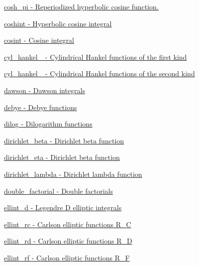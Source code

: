 \begin{DoxyItemize}
\item \hyperlink{group__gnu__math__spec__func_ga633224563637e80a4cda93863a693ad6}{cosh\+\_\+pi -\/ Reperiodized hyperbolic cosine function.}
\item \hyperlink{group__gnu__math__spec__func_ga901c23871fded7d4467a864fe06bbf07}{coshint -\/ Hyperbolic cosine integral}
\item \hyperlink{group__gnu__math__spec__func_ga06eed76a045a73ad72fcf4ad00b05f96}{cosint -\/ Cosine integral}
\item \hyperlink{group__gnu__math__spec__func_gafa5ad1cfd4cc30caaeb06bdab71e600b}{cyl\+\_\+hankel\+\_ -\/ Cylindrical Hankel functions of the first kind}
\item \hyperlink{group__gnu__math__spec__func_ga6c1d2d390e547ded9e0f4cc46395d90c}{cyl\+\_\+hankel\+\_ -\/ Cylindrical Hankel functions of the second kind}
\item \hyperlink{group__gnu__math__spec__func_ga0623ddcbfdce696781e19648fde6f33a}{dawson -\/ Dawson integrals}
\item \hyperlink{group__gnu__math__spec__func_ga4bd3029fcde3afdeee5f313b2ebc6b0d}{debye -\/ Debye functions}
\item \hyperlink{group__gnu__math__spec__func_ga7a95a3cb9a53aca2a1ff9752ce9d5e3c}{dilog -\/ Dilogarithm functions}
\item \hyperlink{group__gnu__math__spec__func_ga87466a2d429a2815d794acc21c882b08}{dirichlet\+\_\+beta -\/ Dirichlet beta function}
\item \hyperlink{group__gnu__math__spec__func_gae46e26e4107675d285c79a2d6202e6c7}{dirichlet\+\_\+eta -\/ Dirichlet beta function}
\item \hyperlink{group__gnu__math__spec__func_ga06842a81bdcabf9c62252dde992d42ee}{dirichlet\+\_\+lambda -\/ Dirichlet lambda function}
\item \hyperlink{group__gnu__math__spec__func_ga08c31a5dd1686a7633b46f923c47af46}{double\+\_\+factorial -\/ Double factorials}
\item \hyperlink{group__gnu__math__spec__func_ga71785ba6bad83f009cb2dc4d2d574194}{ellint\+\_\+d -\/ Legendre D elliptic integrals}
\item \hyperlink{group__gnu__math__spec__func_ga21b90daf6c8d705b052304905809d2db}{ellint\+\_\+rc -\/ Carlson elliptic functions R\+\_\+C}
\item \hyperlink{group__gnu__math__spec__func_ga6467a19028332392df825e232a97139f}{ellint\+\_\+rd -\/ Carlson elliptic functions R\+\_\+D}
\item \hyperlink{group__gnu__math__spec__func_ga9242fbc43bd340e0def2a6f15b755c1c}{ellint\+\_\+rf -\/ Carlson elliptic functions R\+\_\+F}

\end{DoxyItemize}
